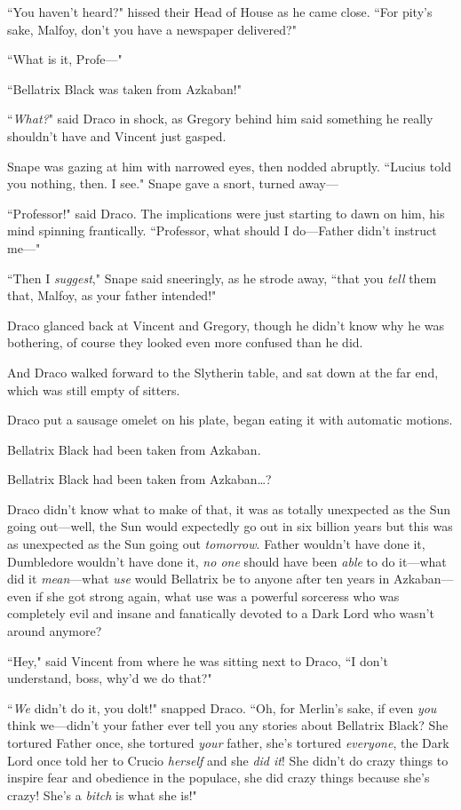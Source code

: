 ``You haven't heard?" hissed their Head of House as he came close. ``For pity's sake, Malfoy, don't you have a newspaper delivered?"

``What is it, Profe---"

``Bellatrix Black was taken from Azkaban!"

``\emph{What?}" said Draco in shock, as Gregory behind him said something he really shouldn't have and Vincent just gasped.

Snape was gazing at him with narrowed eyes, then nodded abruptly. ``Lucius told you nothing, then. I see." Snape gave a snort, turned away---

``Professor!" said Draco. The implications were just starting to dawn on him, his mind spinning frantically. ``Professor, what should I do---Father didn't instruct me---"

``Then I \emph{suggest}," Snape said sneeringly, as he strode away, ``that you \emph{tell} them that, Malfoy, as your father intended!"

Draco glanced back at Vincent and Gregory, though he didn't know why he was bothering, of course they looked even more confused than he did.

And Draco walked forward to the Slytherin table, and sat down at the far end, which was still empty of sitters.

Draco put a sausage omelet on his plate, began eating it with automatic motions.

Bellatrix Black had been taken from Azkaban.

Bellatrix Black had been taken from Azkaban{\ldots}?

Draco didn't know what to make of that, it was as totally unexpected as the Sun going out---well, the Sun would expectedly go out in six billion years but this was as unexpected as the Sun going out \emph{tomorrow}. Father wouldn't have done it, Dumbledore wouldn't have done it, \emph{no one} should have been \emph{able} to do it---what did it \emph{mean}---what \emph{use} would Bellatrix be to anyone after ten years in Azkaban---even if she got strong again, what use was a powerful sorceress who was completely evil and insane and fanatically devoted to a Dark Lord who wasn't around anymore?

``Hey," said Vincent from where he was sitting next to Draco, ``I don't understand, boss, why'd we do that?"

``\emph{We} didn't do it, you dolt!" snapped Draco. ``Oh, for Merlin's sake, if even \emph{you} think we---didn't your father ever tell you any stories about Bellatrix Black? She tortured Father once, she tortured \emph{your} father, she's tortured \emph{everyone}, the Dark Lord once told her to Crucio \emph{herself} and she \emph{did it}! She didn't do crazy things to inspire fear and obedience in the populace, she did crazy things because she's crazy! She's a \emph{bitch} is what she is!"

